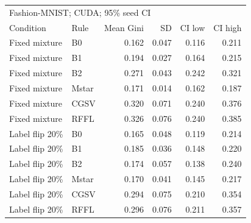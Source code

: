 \begin{tabular}{llrrrr}
\toprule
\multicolumn{6}{l}{Fashion-MNIST; CUDA; 95\% seed CI} \\
Condition & Rule & Mean Gini & SD & CI low & CI high \\
\midrule
Fixed mixture & B0 & 0.162 & 0.047 & 0.116 & 0.211 \\
Fixed mixture & B1 & 0.194 & 0.027 & 0.164 & 0.215 \\
Fixed mixture & B2 & 0.271 & 0.043 & 0.242 & 0.321 \\
Fixed mixture & Mstar & 0.171 & 0.014 & 0.162 & 0.187 \\
Fixed mixture & CGSV & 0.320 & 0.071 & 0.240 & 0.376 \\
Fixed mixture & RFFL & 0.326 & 0.076 & 0.240 & 0.385 \\
Label flip 20\% & B0 & 0.165 & 0.048 & 0.119 & 0.214 \\
Label flip 20\% & B1 & 0.185 & 0.036 & 0.148 & 0.220 \\
Label flip 20\% & B2 & 0.174 & 0.057 & 0.138 & 0.240 \\
Label flip 20\% & Mstar & 0.170 & 0.041 & 0.145 & 0.217 \\
Label flip 20\% & CGSV & 0.294 & 0.075 & 0.210 & 0.354 \\
Label flip 20\% & RFFL & 0.296 & 0.076 & 0.211 & 0.357 \\
\bottomrule
\end{tabular}
